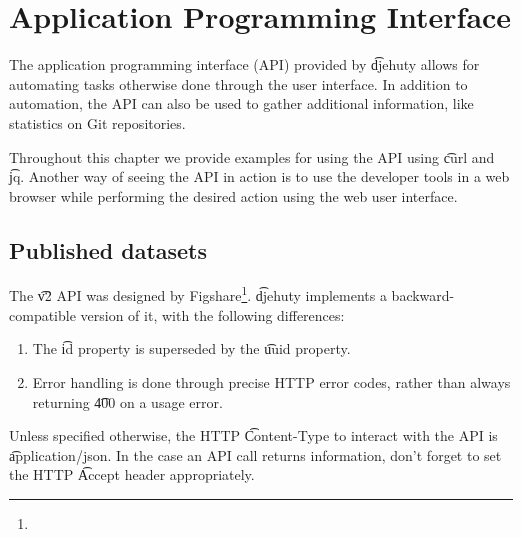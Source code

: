 \newcommand{\categoriesParameters}{%
  The parameters sent to the server should be a JSON object with a single key
  named \t{categories}, with as value a list of either the numeric or the UUID
  identifiers for a category.  The API endpoint described in
  \refer{sec:api-v2-articles-categories-get} shows how to obtain the category
  identifiers.
}

\newcommand{\searchParameters}{%
\begin{tabularx}{\textwidth}{*{3}{!{\VRule[-1pt]}l}!{\VRule[-1pt]}X}
  \headrow
  \textbf{Parameter} & \textbf{Data type} & \textbf{Required} & \textbf{Description}\\
  \t{search\_for}    & \t{string}         & Optional & The terms to search for.
\end{tabularx}}

\chapter{Application Programming Interface}

  The application programming interface (API) provided by \t{djehuty} allows
  for automating tasks otherwise done through the user interface.  In addition
  to automation, the API can also be used to gather additional information,
  like statistics on Git repositories.

  Throughout this chapter we provide examples for using the API using \t{curl} and \t{jq}.
  Another way of seeing the API in action is to use the developer tools in a web
  browser while performing the desired action using the web user interface.

\section{Published datasets}

  The \t{v2} API was designed by Figshare\footnote{}.
  \t{djehuty} implements a backward-compatible version of it, with the
  following differences:
  \begin{enumerate}
    \item{The \t{id} property is superseded by the \t{uuid} property.}
    \item{Error handling is done through precise HTTP error codes,
        rather than always returning \t{400} on a usage error.}
  \end{enumerate}

  Unless specified otherwise, the HTTP \t{Content-Type} to interact
  with the API is \t{application/json}.  In the case an API call returns
  information, don't forget to set the HTTP \t{Accept} header appropriately.

